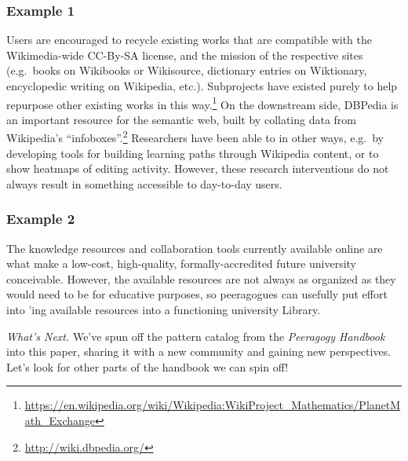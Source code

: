 \subsubsection*{Example 1}
Users are encouraged to recycle existing works that are compatible
with the Wikimedia-wide CC-By-SA license, and the mission of the
respective sites (e.g.~books on Wikibooks or Wikisource, dictionary
entries on Wiktionary, encyclopedic writing on Wikipedia, etc.).  Subprojects have existed purely to help repurpose other existing works in this
way.\footnote{\url{https://en.wikipedia.org/wiki/Wikipedia:WikiProject_Mathematics/PlanetMath_Exchange}}  On the downstream side, DBPedia is an important resource for the
semantic web, built by collating data from Wikipedia's
``infoboxes''.\footnote{\url{http://wiki.dbpedia.org/}} Researchers
have been able to  in other ways,
e.g.~by developing tools for building learning paths through Wikipedia
content, or to show heatmaps of editing activity.  However, these
research interventions do not always result in something accessible to
day-to-day users.

\vspace{.05cm}

\subsubsection*{Example 2}
The knowledge resources and collaboration tools currently available online
are what make a low-cost, high-quality, formally-accredited future university
conceivable.  However, the available resources are not always as
organized as they would need to be for educative purposes, so peeragogues can usefully put
effort into 'ing available
resources into a functioning university Library.


\begin{framed}
\noindent 
\emph{What's Next.}
We've spun off the pattern catalog from the \emph{Peeragogy Handbook} into this paper, sharing it with a new community and gaining new perspectives.  Let's look for other parts of the handbook we can spin off!
\end{framed}



    
    

